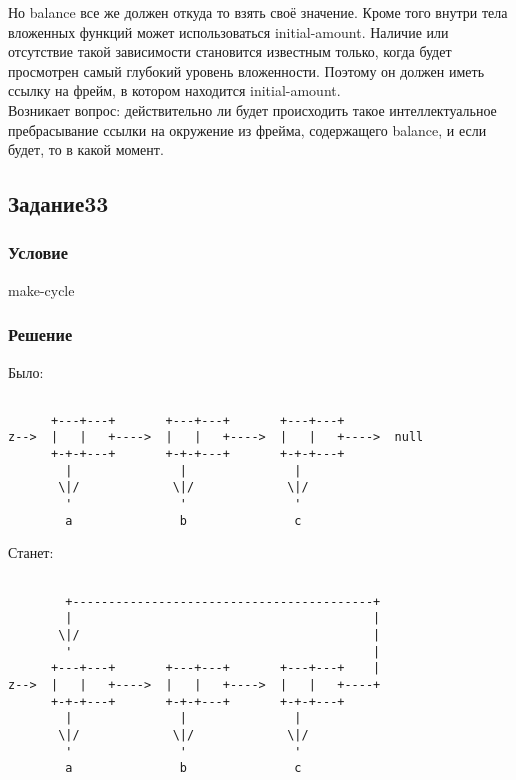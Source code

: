 \documentclass[10pt,a4paper]{article}
\begin{document}
Но balance все же должен откуда то взять своё значение. Кроме того
внутри тела вложенных функций может 
использоваться initial-amount. Наличие или отсутствие такой
зависимости становится известным только, когда будет просмотрен самый
глубокий уровень вложенности. Поэтому он
должен иметь ссылку на фрейм, в котором находится
initial-amount. \\
Возникает вопрос: действительно ли будет происходить
такое интеллектуальное пребрасывание ссылки на окружение из фрейма,
содержащего balance, и если будет, то в какой момент.

\lstset{ %
basicstyle=\footnotesize,       %
frame=none
}


\subsection*{Задание33}
\subsubsection*{Условие}
make-cycle
\subsubsection*{Решение}

Было:
\begin{lstlisting}

      +---+---+       +---+---+       +---+---+
z-->  |   |   +---->  |   |   +---->  |   |   +---->  null
      +-+-+---+       +-+-+---+       +-+-+---+
        |               |               |
       \|/             \|/             \|/
        '               '               '
        a               b               c

\end{lstlisting}

Станет:
\begin{lstlisting}

        +------------------------------------------+
        |                                          |
       \|/                                         |
        '                                          |
      +---+---+       +---+---+       +---+---+    |
z-->  |   |   +---->  |   |   +---->  |   |   +----+
      +-+-+---+       +-+-+---+       +-+-+---+
        |               |               |
       \|/             \|/             \|/
        '               '               '
        a               b               c

\end{lstlisting}
\end{document}
